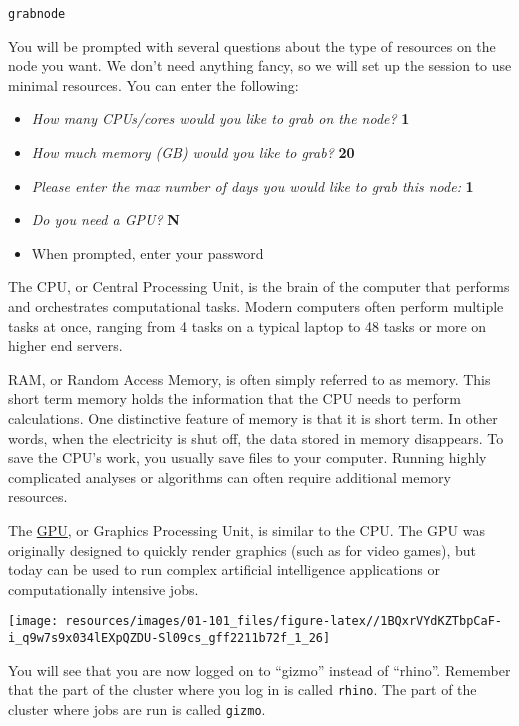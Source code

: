 \documentclass[
]{book}
\providecommand{\tightlist}{%
  \setlength{\itemsep}{0pt}\setlength{\parskip}{0pt}}
\begin{document}
\begin{verbatim}
grabnode
\end{verbatim}

You will be prompted with several questions about the type of resources on the node you want. We don't need anything fancy, so we will set up the session to use minimal resources. You can enter the following:

\begin{itemize}
\tightlist
\item
  \emph{How many CPUs/cores would you like to grab on the node?} \textbf{1}
\item
  \emph{How much memory (GB) would you like to grab?} \textbf{20}
\item
  \emph{Please enter the max number of days you would like to grab this node:} \textbf{1}
\item
  \emph{Do you need a GPU?} \textbf{N}
\item
  When prompted, enter your password
\end{itemize}

The CPU, or Central Processing Unit, is the brain of the computer that performs and orchestrates computational tasks. Modern computers often perform multiple tasks at once, ranging from 4 tasks on a typical laptop to 48 tasks or more on higher end servers.

RAM, or Random Access Memory, is often simply referred to as memory. This short term memory holds the information that the CPU needs to perform calculations. One distinctive feature of memory is that it is short term. In other words, when the electricity is shut off, the data stored in memory disappears. To save the CPU's work, you usually save files to your computer. Running highly complicated analyses or algorithms can often require additional memory resources.

The \href{https://www.intel.com/content/www/us/en/products/docs/processors/what-is-a-gpu.html}{GPU}, or Graphics Processing Unit, is similar to the CPU. The GPU was originally designed to quickly render graphics (such as for video games), but today can be used to run complex artificial intelligence applications or computationally intensive jobs.

\texttt{[image: resources/images/01-101\_files/figure-latex//1BQxrVYdKZTbpCaF-i\_q9w7s9x034lEXpQZDU-Sl09cs\_gff2211b72f\_1\_26]}

You will see that you are now logged on to ``gizmo'' instead of ``rhino''. Remember that the part of the cluster where you log in is called \texttt{rhino}. The part of the cluster where jobs are run is called \texttt{gizmo}.
\end{document}
